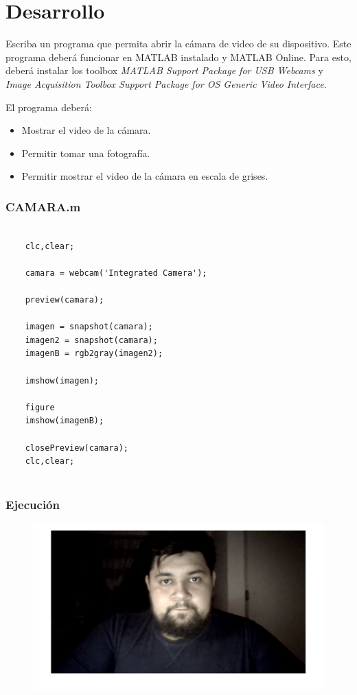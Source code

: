 \documentclass{article}
\begin{document}
	\newpage
	
	\section{Desarrollo}
	
	Escriba un programa que permita abrir la cámara de video de su dispositivo. Este programa deberá funcionar en MATLAB instalado y MATLAB Online. Para esto, deberá instalar los toolbox \textit{MATLAB Support Package for USB Webcams} y \textit{Image Acquisition Toolbox Support Package for OS Generic Video Interface}.
	
	El programa deberá:
	
	\begin{itemize}
		\item Mostrar el video de la cámara.
		\item Permitir tomar una fotografía.
		\item Permitir mostrar el video de la cámara en escala de grises.
	\end{itemize}
	
	\newpage
	
	\subsubsection{CAMARA.m}
	
	\begin{lstlisting}
		
	clc,clear;
	
	camara = webcam('Integrated Camera');
	
	preview(camara);
	
	imagen = snapshot(camara);
	imagen2 = snapshot(camara);
	imagenB = rgb2gray(imagen2);
	
	imshow(imagen);
	
	figure
	imshow(imagenB);
	
	closePreview(camara);
	clc,clear;
	
	\end{lstlisting}
	
	\newpage
	
	\subsubsection{Ejecución}
	
	\begin{figure}[h]
		\centering
		\includegraphics[width=\textwidth]{img1.png}
	\end{figure}
	
\end{document}
